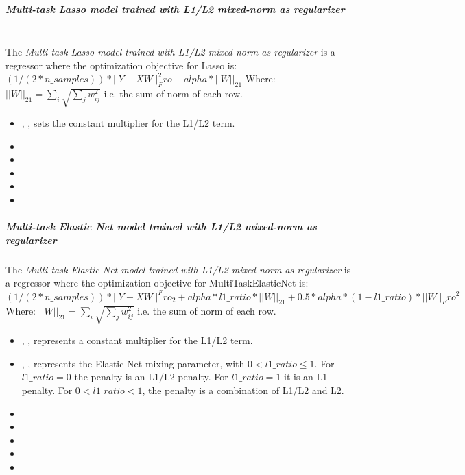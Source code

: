 \subparagraph{Multi-task Lasso model trained with L1/L2 mixed-norm as
  regularizer}
\mbox{}
\\The \textit{Multi-task Lasso model trained with L1/L2 mixed-norm as
  regularizer} is a regressor where the optimization objective for Lasso is:
$(1 / (2 * n\_samples)) * ||Y - XW||^2_Fro + alpha * ||W||_21$
Where:
$||W||_21 = \sum_i \sqrt{\sum_j w_{ij}^2}$
i.e. the sum of norm of each row.
%
\begin{itemize}
  \item {}, , sets the constant 
  multiplier for the L1/L2 term.
  \item {}
  \item {}
  \item \maxIterDescription{}
  \item {}
  \item \warmStartDescription{}
\end{itemize}

\subparagraph{Multi-task Elastic Net model trained with L1/L2 mixed-norm as
  regularizer}
\mbox{}

The \textit{Multi-task Elastic Net model trained with L1/L2 mixed-norm as
  regularizer} is a regressor where the optimization objective for
MultiTaskElasticNet is:
$(1 / (2 * n\_samples)) * ||Y - XW||^Fro_2
+ alpha * l1\_ratio * ||W||_21
+ 0.5 * alpha * (1 - l1\_ratio) * ||W||_Fro^2$
Where:
$||W||_21 = \sum_i \sqrt{\sum_j w_{ij}^2}$
i.e. the sum of norm of each row.
%
\begin{itemize}
  \item {}, , represents a constant
  multiplier for the L1/L2 term.
  \item {}, , represents the Elastic Net mixing
  parameter, with $0 < l1\_ratio \leq 1$.
  For $l1\_ratio = 0$ the penalty is an L1/L2 penalty.
  For $l1\_ratio = 1$ it is an L1 penalty.
  For $0 < l1\_ratio < 1$, the penalty is a combination of L1/L2
  and L2.
  \item {}
  \item {}
  \item \maxIterDescription{}
  \item {}
  \item \warmStartDescription{}
\end{itemize}

